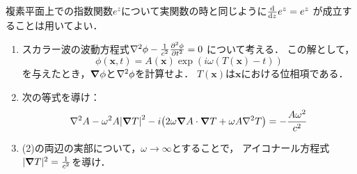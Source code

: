 \documentclass[dvipdfmx,a4j,11pt]{jsarticle}
\theoremstyle{mystyle}
\begin{document}
\begin{enumerate}[1.]
         複素平面上での指数関数$e^z$について実関数の時と同じように$\dv{z} e^z=e^z$
         が成立することは用いてよい．
         \begin{enumerate}[(1)]
            \item スカラー波の波動方程式$\laplacian \phi -\frac{1}{c^2}\pdv[2]{\phi}{t}=0 $
                  について考える．
                  この解として，
                  \[ \phi(\bm{x},t) =A(\bm{x})\exp(i\omega (T(\bm{x})-t))\]
                  を与えたとき，$\grad \phi$と$\laplacian \phi$を計算せよ．
                  $T(\bm{x})$は$\bm{x}$における位相項である．
            \item 次の等式を導け：
                  \[\laplacian A- \omega^2 A\qty|\grad T|^2
                  -i\qty(2\omega \grad A \cdot \grad T+\omega A \laplacian T)=
                  -\frac{A\omega^2}{c^2} \]
            \item (2)の両辺の実部について，$\omega\to \infty$とすることで，
                  アイコナール方程式$|\grad T|^2=\frac{1}{c^2}$を導け．
         \end{enumerate}

\end{enumerate}
\end{document}
